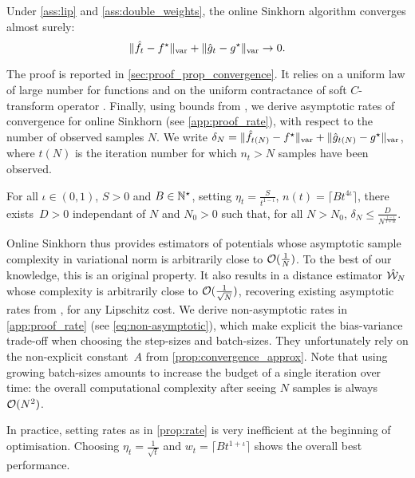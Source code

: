 \begin{proposition}\label{prop:convergence_true}
    Under \autoref{ass:lip} and
    \ref{ass:double_weights}, the online Sinkhorn algorithm converges almost surely:
    \begin{equation}
        \Vert \hat f_t - f^\star \Vert_{\text{\upshape var}} + \Vert \hat g_t - g^\star \Vert_{\text{\upshape var}} \to 0.
    \end{equation}
\end{proposition}

The proof is reported in \autoref{sec:proof_prop_convergence}. It relies on a uniform
law of large number for functions \citep[][chapter
19]{van_der_vaart_asymptotic_2000} and on the uniform contractance of soft
$C$-transform operator \citep[e.g.][Proposition 19]{vialard2019elementary}. Finally, using bounds from \cite{moulines_non-asymptotic_2011}, we derive  asymptotic rates of convergence for online Sinkhorn (see \autoref{app:proof_rate}), with
respect to the number of observed samples $N$. We write $\delta_N = \Vert \hat
f_{t(N)} - f^\star \Vert_{\text{\upshape var}} + \Vert \hat g_{t(N)} - g^\star \Vert_{\text{\upshape var}}$,
where $t(N)$ is the iteration number for which $n_t > N$ samples have been observed.

\begin{proposition}\label{prop:rate}
    For all $\iota \in (0, 1)$, $S > 0$ and $B \in \mathbb{N}^\star$, setting $\eta_t =
    \frac{S}{t^{1 - \iota}}$, $n(t) = \lceil B t^{4\iota} \rceil$, there
    exists~$D > 0$ independant of $N$ and $N_0 > 0$ such that, for all $N >
    N_0$, $\delta_N \leq \frac{D}{N^{\frac{1 - \iota}{1 + 4 \iota}}}$.
\end{proposition}

Online Sinkhorn thus provides estimators of potentials whose asymptotic sample
complexity in variational norm is arbitrarily close to $\mathcal{O}(\frac{1}{N})$. To
the best of our knowledge, this is an original property. It also results in a distance estimator $\hat {\mathcal{W}}_N$ whose
complexity is arbitrarily close to $\mathcal{O}(\frac{1}{\sqrt{N}})$, recovering
existing asymptotic rates from \cite{2019-Genevay-aistats}, for any Lipschitz cost. We derive non-asymptotic rates in \autoref{app:proof_rate} (see \eqref{eq:non-asymptotic}), which make explicit the
bias-variance trade-off when choosing the step-sizes and batch-sizes. They
unfortunately rely on the non-explicit constant~$A$ from
\autoref{prop:convergence_approx}. Note that using growing batch-sizes amounts
to increase the budget of a single iteration over time: the overall
computational complexity after seeing $N$ samples is always $\mathcal{O}(N^2)$.

In practice, setting rates as in
\autoref{prop:rate} is very inefficient at the beginning of optimisation. Choosing $\eta_t = \frac{1}{\sqrt{t}}$ and $w_t = \lceil B t^{1 + \iota} \rceil$
shows the overall best performance.

